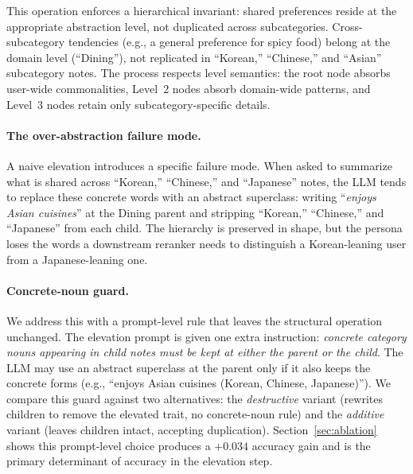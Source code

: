 \documentclass[sigconf,review,anonymous]{acmart}
\begin{document}
This operation enforces a hierarchical invariant: shared preferences reside at the appropriate abstraction level, not duplicated across subcategories. Cross-subcategory tendencies (e.g., a general preference for spicy food) belong at the domain level (``Dining''), not replicated in ``Korean,'' ``Chinese,'' and ``Asian'' subcategory notes. The process respects level semantics: the root node absorbs user-wide commonalities, Level~2 nodes absorb domain-wide patterns, and Level~3 nodes retain only subcategory-specific details.

\paragraph{The over-abstraction failure mode.}
A naive elevation introduces a specific failure mode. When asked to summarize what is shared across ``Korean,'' ``Chinese,'' and ``Japanese'' notes, the LLM tends to replace these concrete words with an abstract superclass: writing ``\textit{enjoys Asian cuisines}'' at the Dining parent and stripping ``Korean,'' ``Chinese,'' and ``Japanese'' from each child. The hierarchy is preserved in shape, but the persona loses the words a downstream reranker needs to distinguish a Korean-leaning user from a Japanese-leaning one.

\paragraph{Concrete-noun guard.}
We address this with a prompt-level rule that leaves the structural operation unchanged. The elevation prompt is given one extra instruction: \emph{concrete category nouns appearing in child notes must be kept at either the parent or the child}. The LLM may use an abstract superclass at the parent only if it also keeps the concrete forms (e.g., ``enjoys Asian cuisines (Korean, Chinese, Japanese)''). We compare this guard against two alternatives: the \emph{destructive} variant (rewrites children to remove the elevated trait, no concrete-noun rule) and the \emph{additive} variant (leaves children intact, accepting duplication). Section~\ref{sec:ablation} shows this prompt-level choice produces a \(+0.034\) accuracy gain and is the primary determinant of accuracy in the elevation step.
\end{document}
